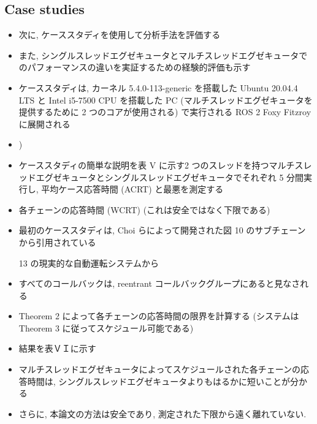 \subsection{Case studies}
\label{ssec: case studies}

\begin{frame}{}
    \begin{itemize}
        \item 次に, ケーススタディを使用して分析手法を評価する
\item また, シングルスレッドエグゼキュータとマルチスレッドエグゼキュータでのパフォーマンスの違いを実証するための経験的評価も示す
\item ケーススタディは, カーネル 5.4.0-113-generic を搭載した Ubuntu 20.04.4 LTS と Intel i5-7500 CPU を搭載した PC (マルチスレッドエグゼキュータを提供するために 2 つのコアが使用される) で実行される ROS 2 Foxy Fitzroy に展開される
\item )
    \end{itemize}
\end{frame}


\begin{frame}{}
    \begin{itemize}
        \item ケーススタディの簡単な説明を表 V に示す2 つのスレッドを持つマルチスレッドエグゼキュータとシングルスレッドエグゼキュータでそれぞれ 5 分間実行し, 平均ケース応答時間 (ACRT) と最悪を測定する
\item 各チェーンの応答時間 (WCRT) (これは安全ではなく下限である)
    \end{itemize}
\end{frame}

\begin{frame}{}
    \begin{itemize}
        \item 最初のケーススタディは, Choi らによって開発された図 10 のサブチェーンから引用されている
\item [13] の現実的な自動運転システムから
\item すべてのコールバックは, reentrant コールバックグループにあると見なされる
\item Theorem 2 によって各チェーンの応答時間の限界を計算する (システムはTheorem 3 に従ってスケジュール可能である)
\item 結果を表ＶＩに示す
\item マルチスレッドエグゼキュータによってスケジュールされた各チェーンの応答時間は, シングルスレッドエグゼキュータよりもはるかに短いことが分かる
\item さらに, 本論文の方法は安全であり, 測定された下限から遠く離れていない.
    \end{itemize}
\end{frame}

